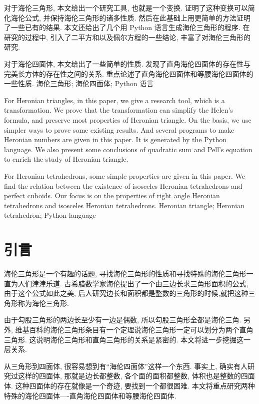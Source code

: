 \documentclass[12pt]{article}
\begin{document}

\begin{abstrace}
对于海伦三角形, 本文给出一个研究工具, 也就是一个变换. 证明了这种变换可以简化海伦公式, 并保持海伦三角形的诸多性质. 然后在此基础上用更简单的方法证明了一些已有的结果. 本文还给出了几个用 Python 语言生成海伦三角形的程序. 在研究的过程中, 引入了二平方和以及佩尔方程的一些结论, 丰富了对海伦三角形的研究. 

对于海伦四面体, 本文给出了一些简单的性质. 发现了直角海伦四面体的存在性与完美长方体的存在性之间的关系. 重点论述了直角海伦四面体和等腰海伦四面体的一些性质. 
\keywords 海伦三角形; 海伦四面体; Python 语言
\end{abstrace}

\begin{enabstrace}
For Heronian triangles, in this paper, we give a research tool, which is a transformation. We prove that the transformation can simplify the Helen's formula, and preserve most properties of Heronian triangle. On the basis, we use simpler ways to prove some existing results. And several programs to make Heronian numbers are given in this paper. It is generated by the Python language. We also present some conclusions of quadratic sum and Pell's equation to enrich the study of Heronian  triangle.
\par\vspace*{.5em}\noindent
For Heronian tetrahedrons, some simple properties are given in this paper. We find the relation between the existence of isosceles Heronian tetrahedrons and perfect cuboids. Our focus is on the properties of right angle Heronian tetrahedrons and isosceles Heronian tetrahedrons.
\keywords Heronian triangle; Heronian tetrahedron; Python language
\end{enabstrace}%


\section{引言}
海伦三角形是一个有趣的话题, 寻找海伦三角形的性质和寻找特殊的海伦三角形一直为人们津津乐道. 古希腊数学家海伦提出了一个由三边长求三角形面积的公式, 由于这个公式如此之美, 后人研究边长和面积都是整数的三角形的时候,就把这种三角形称为海伦三角形. 

由于勾股三角形的两边长至少有一边是偶数, 所以勾股三角形全都是海伦三角. 另外, 维基百科的海伦三角形条目有一个定理说海伦三角形一定可以划分为两个直角三角形. 这说明海伦三角形和直角三角形的关系是紧密的. 本文将进一步挖掘这一层关系.

从三角形到四面体, 很容易想到有``海伦四面体''这样一个东西. 事实上, 确实有人研究过这样的四面体, 那就是边长都整数, 各个面的面积都整数, 体积也是整数的四面体. 这种四面体的存在就像是一个奇迹, 要找到一个都很困难. 本文将重点研究两种特殊的海伦四面体----直角海伦四面体和等腰海伦四面体. 
\end{document}
